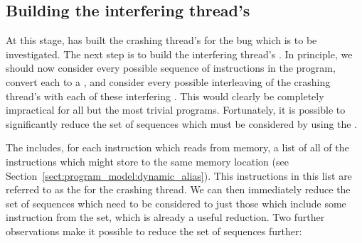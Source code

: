 \subsection{Building the interfering thread's \StateMachines}
\label{sect:derive:write_side}

At this stage, {\technique} has built the crashing thread's
{\StateMachine} for the bug which is to be investigated.  The next
step is to build the interfering thread's {\StateMachine}.  In
principle, we should now consider every possible sequence of
\backref{$\alpha$} instructions in the program, convert each to a
{\StateMachine}, and consider every possible interleaving of
the crashing thread's {\StateMachine} with each of these
interfering {\StateMachines}.  This would clearly be
completely impractical for all but the most trivial programs.
Fortunately, it is possible to significantly reduce the set of
sequences which must be considered by using the
.

The  includes, for each instruction which reads
from memory, a list of all of the instructions which might store to
the same memory location (see
Section~\ref{sect:program_model:dynamic_alias}).  This instructions in
this list are referred to as the  for
the crashing thread.  We can then immediately reduce the set of
sequences which need to be considered to just those which include some
instruction from the  set, which is
already a useful reduction.  Two further observations make it possible
to reduce the set of sequences further:


